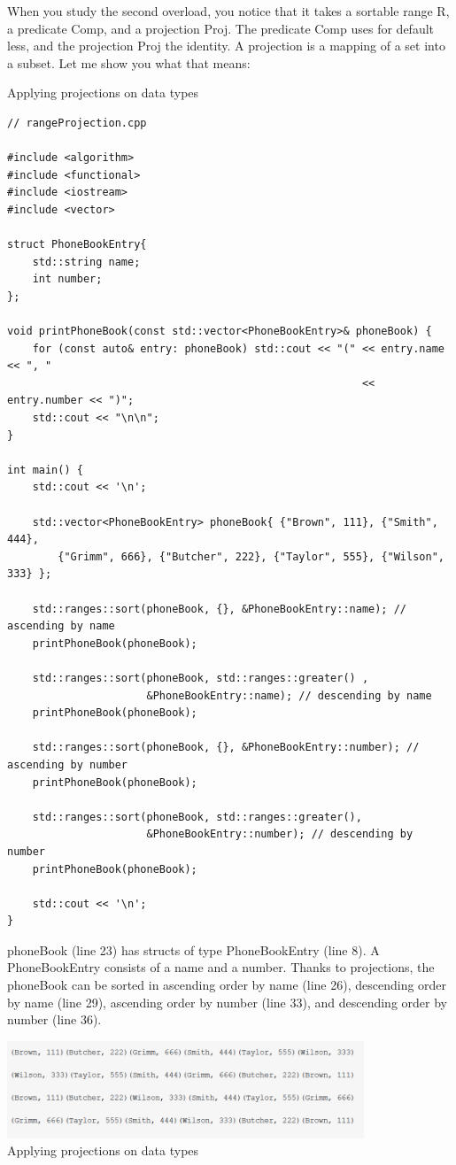 When you study the second overload, you notice that it takes a sortable range R, a predicate Comp, and a projection Proj. The predicate Comp uses for default less, and the projection Proj the identity. A projection is a mapping of a set into a subset. Let me show you what that means:

\noindent
Applying projections on data types
\begin{lstlisting}[style=styleCXX]
// rangeProjection.cpp

#include <algorithm>
#include <functional>
#include <iostream>
#include <vector>

struct PhoneBookEntry{
	std::string name;
	int number;
};

void printPhoneBook(const std::vector<PhoneBookEntry>& phoneBook) {
	for (const auto& entry: phoneBook) std::cout << "(" << entry.name << ", "
	                                                    << entry.number << ")";
	std::cout << "\n\n";
}

int main() {
	std::cout << '\n';
	
	std::vector<PhoneBookEntry> phoneBook{ {"Brown", 111}, {"Smith", 444},
		{"Grimm", 666}, {"Butcher", 222}, {"Taylor", 555}, {"Wilson", 333} };
	
	std::ranges::sort(phoneBook, {}, &PhoneBookEntry::name); // ascending by name
	printPhoneBook(phoneBook);
	
	std::ranges::sort(phoneBook, std::ranges::greater() ,
	                  &PhoneBookEntry::name); // descending by name
	printPhoneBook(phoneBook);
	
	std::ranges::sort(phoneBook, {}, &PhoneBookEntry::number); // ascending by number
	printPhoneBook(phoneBook);
	
	std::ranges::sort(phoneBook, std::ranges::greater(),
	                  &PhoneBookEntry::number); // descending by number
	printPhoneBook(phoneBook);
	
	std::cout << '\n';
}
\end{lstlisting}

phoneBook (line 23) has structs of type PhoneBookEntry (line 8). A PhoneBookEntry consists of a name and a number. Thanks to projections, the phoneBook can be sorted in ascending order by name (line 26), descending order by name (line 29), ascending order by number (line 33), and descending order by number (line 36).

\begin{center}
\includegraphics[width=0.8\textwidth]{content/3/chapter5/images/1-1.png}\\
Applying projections on data types
\end{center}


